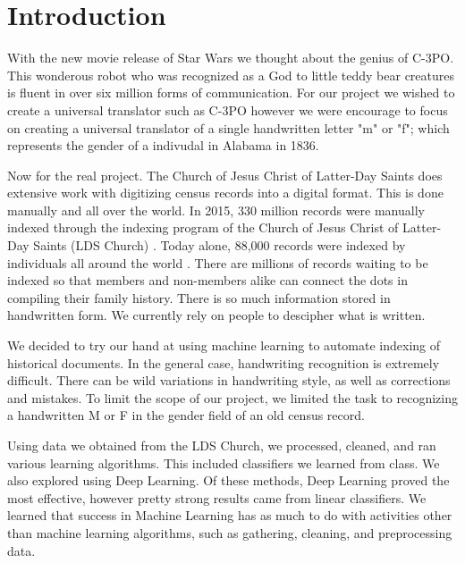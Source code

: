 \section{Introduction}



With the new movie release of Star Wars we thought about the genius of C-3PO.  This wonderous robot who was recognized as a God to little teddy bear creatures is fluent in over six million forms of communication.  For our project we wished to create a universal translator such as C-3PO however we were encourage to focus on creating a universal translator of a single handwritten letter "m" or "f"; which represents the gender of a indivudal in Alabama in 1836.

Now for the real project.  The Church of Jesus Christ of Latter-Day Saints does extensive work with digitizing census records into a digital format.  This is done manually and all over the world.  In 2015, 330 million records were manually indexed through the indexing program of the Church of Jesus Christ of Latter-Day Saints (LDS Church) \cite{web:indexingStats}.  Today alone, 88,000 records were indexed by individuals all around the world \cite{web:indexingStats}.  There are millions of records waiting to be indexed so that members and non-members alike can connect the dots in compiling their family history.  There is so much information stored in handwritten form.  We currently rely on people to descipher what is written.

We decided to try our hand at using machine learning to automate indexing of historical documents.  In the general case, handwriting recognition is extremely difficult.  There can be wild variations in handwriting style, as well as corrections and mistakes.  To limit the scope of our project, we limited the task to recognizing a handwritten M or F in the gender field of an old census record.

Using data we obtained from the LDS Church, we processed, cleaned, and ran various learning algorithms.  This included classifiers we learned from class.  We also explored using Deep Learning.  Of these methods, Deep Learning proved the most effective, however pretty strong results came from linear classifiers.  We learned that success in Machine Learning has as much to do with activities other than machine learning algorithms, such as gathering, cleaning, and preprocessing data.

